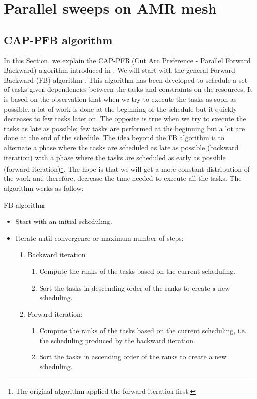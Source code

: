 \documentclass{mc2015}
\renewcommand{\(}{\left(}
\renewcommand{\)}{\right)}
\renewcommand{\[}{\left[}
\renewcommand{\]}{\right]}
\begin{document}
\section{Parallel sweeps on AMR mesh} \label{parallel_sweeps}

\subsection{CAP-PFB algorithm}

In this Section, we explain the CAP-PFB (Cut Arc Preference - Parallel Forward
Backward) algorithm introduced in \cite{Mo2014}. We will start with the general
Forward-Backward (FB) algorithm \cite{Li1992}. This algorithm has been developed
to schedule a set of tasks given dependencies between the tasks and constraints
on the resources. It is based on the observation that when we try to execute the
tasks as soon as possible, a lot of work is done at the beginning of the
schedule but it quickly decreases to few tasks later
on. The opposite is true when we try to execute the tasks as late as possible;
few tasks are performed at the beginning but a lot are done at the end
of the schedule. The idea beyond the FB algorithm is to alternate a phase where the
tasks are scheduled as late as possible (backward iteration) with a phase where the
tasks are scheduled as early as possible (forward iteration)\footnote{The
original algorithm applied the forward iteration first.}. The hope is
that we will get a more constant distribution of the work and therefore,
decrease the time needed to execute all the tasks. The algorithm works as
follow:
\begin{algorithm}[H]
  \caption{FB algorithm}
  \begin{itemize}
    \item Start with an initial scheduling.
    \item Iterate until convergence or maximum number of steps:
      \begin{enumerate}
        \item Backward iteration:
          \begin{enumerate}
            \item Compute the ranks of the tasks based on the current scheduling.
            \item Sort the tasks in descending order of the ranks to create a
              new scheduling.
          \end{enumerate}
        \item Forward iteration:
          \begin{enumerate}
            \item Compute the ranks of the tasks based on the current
              scheduling, i.e. the scheduling produced by the backward
              iteration.
            \item Sort the tasks in ascending order of the ranks to create a new
              scheduling.
          \end{enumerate}
      \end{enumerate}
  \end{itemize}
  \label{fb}
\end{algorithm}
\end{document}
